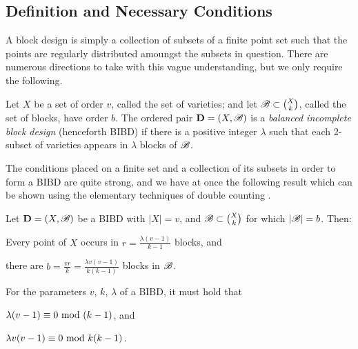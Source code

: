 \documentclass[../../../main]{subfiles}
\begin{document}
\subsection{Definition and Necessary Conditions}

A block design is simply a collection of subsets of a finite point set such
that the points are regularly distributed amoungst the subsets in question.
There are numerous directions to take with this vague understanding, but we only
require the following.

 \begin{defin}\label{bibd}
 Let $X$ be a set of order $v$, called the set of varieties; and let $\mathscr{B} \subset \binom{X}{k}$, called the set of blocks, have order $b$. The ordered pair $\mathbf{D}=(X,\mathscr{B})$ is a {\it balanced incomplete block design} (henceforth BIBD) if there is a positive integer $\lambda$ such that each 2-subset of varieties appears in $\lambda$ blocks of $\mathscr{B}$. \\
 \end{defin}

 The conditions placed on a finite set and a collection of its subsets in order
 to form a BIBD are quite strong, and we have at once the following result which
 can be shown using the elementary techniques of double counting
 \cite[see][Chapter 2 for
 an abstract discussion]{cameron-combinatorics}.

 \begin{prop}\label{prop-bibd-params}
   Let $\mathbf{D}=(X,\mathscr{B})$ be a BIBD with $|X| = v$, and $\mathscr{B} \subset \binom{X}{k}$ for which $|\mathscr{B}| = b$. Then:
   \begin{defenum}
   \item\label{replications} Every point of $X$ occurs in $r = \frac{\lambda(v-1)}{k-1}$ blocks, and 
   \item\label{blocks} there are $b = \frac{vr}{k} = \frac{\lambda v(v-1)}{k(k-1)}$ blocks in $\mathscr{B}$.
   \end{defenum}
 \end{prop}

 \begin{cor}\label{cor-bibd-params}
   For the parameters $v$, $k$, $\lambda$ of a BIBD, it must hold that 
   \begin{defenum}
   \item $\lambda(v-1) \equiv 0 \text{ mod } (k-1)$, and
   \item $\lambda v(v-1) \equiv 0 \text{ mod } k(k-1)$.
   \end{defenum}
 \end{cor}
\end{document}
